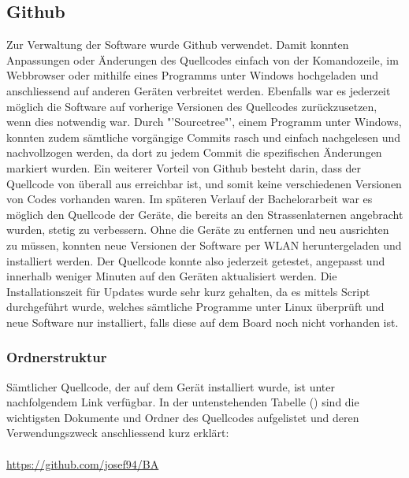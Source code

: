 \subsection{Github}
Zur Verwaltung der Software wurde Github verwendet. Damit konnten Anpassungen oder Änderungen des Quellcodes einfach von der Komandozeile, im Webbrowser oder mithilfe eines Programms unter Windows hochgeladen und anschliessend auf anderen Geräten verbreitet werden. Ebenfalls war es jederzeit möglich die Software auf vorherige Versionen des Quellcodes zurückzusetzen, wenn dies notwendig war. Durch "'Sourcetree"', einem Programm unter Windows, konnten zudem sämtliche vorgängige Commits rasch und einfach nachgelesen und nachvollzogen werden, da dort zu jedem Commit die spezifischen Änderungen markiert wurden. Ein weiterer Vorteil von Github besteht darin, dass der Quellcode von überall aus erreichbar ist, und somit keine verschiedenen Versionen von Codes vorhanden waren. 
Im späteren Verlauf der Bachelorarbeit war es möglich den Quellcode der Geräte, die bereits an den Strassenlaternen angebracht wurden, stetig zu verbessern. Ohne die Geräte zu entfernen und neu ausrichten zu müssen, konnten neue Versionen der Software per WLAN heruntergeladen und installiert werden. Der Quellcode konnte also jederzeit getestet, angepasst und innerhalb weniger Minuten auf den Geräten aktualisiert werden. Die Installationszeit für Updates wurde sehr kurz gehalten, da es mittels Script durchgeführt wurde, welches sämtliche Programme unter Linux überprüft und neue Software nur installiert, falls diese auf dem Board noch nicht vorhanden ist.

\subsubsection{Ordnerstruktur}
Sämtlicher Quellcode, der auf dem Gerät installiert wurde, ist unter nachfolgendem Link verfügbar. In der untenstehenden Tabelle () sind die wichtigsten Dokumente und Ordner des Quellcodes aufgelistet und deren Verwendungszweck anschliessend kurz erklärt:\\\\
\url{https://github.com/josef94/BA}\\

\setlength\tabcolsep{5pt}

